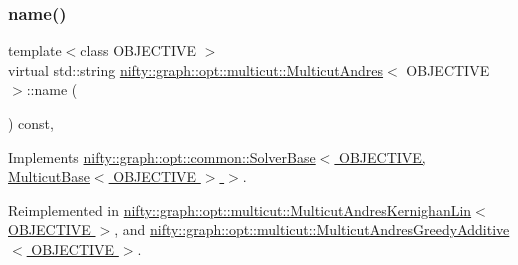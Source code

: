 \mbox{\label{classnifty_1_1graph_1_1opt_1_1multicut_1_1MulticutAndres_ac7a32dbee9103beb72ba2cf6fcd6ecee}} 
\subsubsection{\texorpdfstring{name()}{name()}}
{\footnotesize\ttfamily template$<$class O\+B\+J\+E\+C\+T\+I\+VE $>$ \\
virtual std\+::string \hyperlink{classnifty_1_1graph_1_1opt_1_1multicut_1_1MulticutAndres}{nifty\+::graph\+::opt\+::multicut\+::\+Multicut\+Andres}$<$ O\+B\+J\+E\+C\+T\+I\+VE $>$\+::name (\begin{DoxyParamCaption}{ }\end{DoxyParamCaption}) const\hspace{0.3cm}{\ttfamily [inline]}, {\ttfamily [virtual]}}



Implements \hyperlink{classnifty_1_1graph_1_1opt_1_1common_1_1SolverBase_af638b9a804cfec3e35fe87c77e942d30}{nifty\+::graph\+::opt\+::common\+::\+Solver\+Base$<$ O\+B\+J\+E\+C\+T\+I\+V\+E, Multicut\+Base$<$ O\+B\+J\+E\+C\+T\+I\+V\+E $>$ $>$}.



Reimplemented in \hyperlink{classnifty_1_1graph_1_1opt_1_1multicut_1_1MulticutAndresKernighanLin_ac4b9f02bd36b35faf2ace3e87a224dcc}{nifty\+::graph\+::opt\+::multicut\+::\+Multicut\+Andres\+Kernighan\+Lin$<$ O\+B\+J\+E\+C\+T\+I\+V\+E $>$}, and \hyperlink{classnifty_1_1graph_1_1opt_1_1multicut_1_1MulticutAndresGreedyAdditive_a2e3775af34622f15e57c60986e2d15d4}{nifty\+::graph\+::opt\+::multicut\+::\+Multicut\+Andres\+Greedy\+Additive$<$ O\+B\+J\+E\+C\+T\+I\+V\+E $>$}.

\mbox{\label{classnifty_1_1graph_1_1opt_1_1multicut_1_1MulticutAndres_abce35dff7d396cade66f8f7611e141f4}} 
